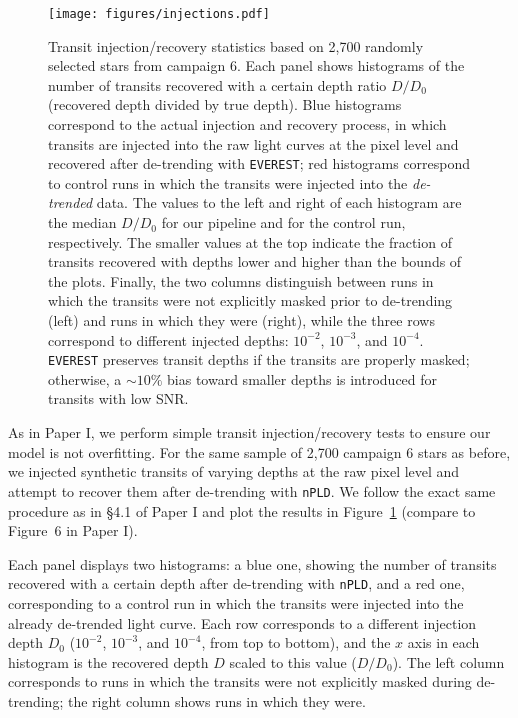 \documentclass[]{aastex62}
\begin{document}
\begin{figure}[hbt]
  \begin{center}
      \texttt{[image: figures/injections.pdf]}
       \caption{Transit injection/recovery statistics based on 2,700 randomly selected stars from campaign 6.
       Each panel shows histograms of the number of transits recovered with a certain depth
       ratio $D/D_0$ (recovered depth divided by true depth). Blue histograms correspond to the actual
       injection and recovery process, in which transits are injected into the raw light curves at the pixel level
       and recovered after de-trending with \texttt{EVEREST}; red histograms correspond to control runs in which the transits
       were injected into the \emph{de-trended} data. The values
       to the left and right of each histogram are the median $D/D_0$ for our pipeline and for the
       control run, respectively. The smaller values at the top indicate the fraction of transits recovered
       with depths lower and higher than the bounds of the plots. Finally, the two columns distinguish between
       runs in which the transits were not explicitly masked prior to de-trending (left) and runs in which they were (right),
       while the three rows correspond to different injected depths: $10^{−2}$, $10^{−3}$, and $10^{−4}$. \texttt{EVEREST}
       preserves transit depths if the transits are properly masked; otherwise, a ${\sim}10\%$ bias toward smaller depths is
       introduced for transits with low SNR.}
     \label{fig:injections}
  \end{center}
\end{figure}

As in Paper I, we perform simple transit injection/recovery tests to ensure
our model is not overfitting. For the same sample of 2,700 campaign 6 stars
as before, we injected synthetic transits of varying depths at the raw pixel level
and attempt to recover them after de-trending with \texttt{nPLD}. We follow
the exact same procedure as in \S4.1 of Paper I and plot the results in
Figure~\ref{fig:injections} (compare to Figure~6 in Paper I).

Each panel displays two histograms: a blue one, showing the number of
transits recovered with a certain depth after de-trending with \texttt{nPLD},
and a red one, corresponding to a control run in which the transits were injected
into the already de-trended light curve. Each row corresponds to a different
injection depth $D_0$ ($10^{-2}$, $10^{-3}$, and $10^{-4}$, from top to bottom), and the $x$ axis
in each histogram is the recovered depth $D$ scaled to this value ($D/D_0$). The
left column corresponds to runs in which the transits were not explicitly masked
during de-trending; the right column shows runs in which they were.
\end{document}
